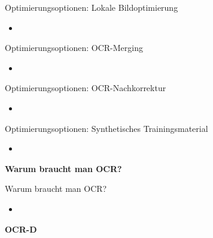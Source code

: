\documentclass{bbawslides}
\begin{document}
\begin{bbawslide}{Optimierungsoptionen: Lokale Bildoptimierung}
  \vspace*{7mm}%
  \centerslidestrue%
  \begin{itemize}
    \item
  \end{itemize}
\end{bbawslide}

\begin{bbawslide}{Optimierungsoptionen: OCR-Merging}
  \vspace*{7mm}%
  \centerslidestrue%
  \begin{itemize}
    \item
  \end{itemize}
\end{bbawslide}

\begin{bbawslide}{Optimierungsoptionen: OCR-Nachkorrektur}
  \vspace*{7mm}%
  \centerslidestrue%
  \begin{itemize}
    \item
  \end{itemize}
\end{bbawslide}

\begin{bbawslide}{Optimierungsoptionen: Synthetisches Trainingsmaterial}
  \vspace*{7mm}%
  \centerslidestrue%
  \begin{itemize}
    \item
  \end{itemize}
\end{bbawslide}

\begin{bbawpart}{\Large\bf Warum braucht man OCR?}
\end{bbawpart}

\begin{bbawslide}{Warum braucht man OCR?}
  \vspace*{7mm}%
  \centerslidestrue%
  \begin{itemize}
    \item
  \end{itemize}
\end{bbawslide}

\begin{bbawpart}{\Large\bf OCR-D}
\end{bbawpart}
\end{document}
